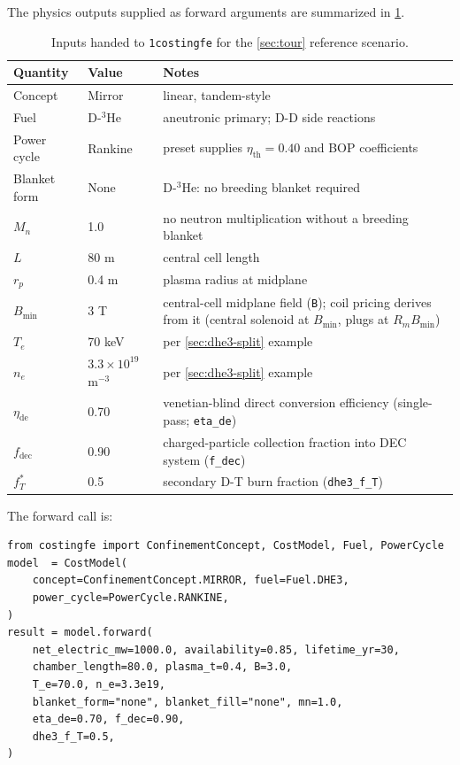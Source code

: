 \documentclass{article}
\begin{document}
The physics outputs supplied as forward arguments are summarized in
\cref{tab:tour-inputs}.

\begin{table}[htbp]
\caption{Inputs handed to \texttt{1costingfe} for the
\cref{sec:tour} reference scenario.}
\label{tab:tour-inputs}
\centering
\begin{tabular}{lll}
\toprule
Quantity & Value & Notes \\
\midrule
Concept       & Mirror              & linear, tandem-style \\
Fuel          & D-${}^3$He          & aneutronic primary; D-D side reactions \\
Power cycle   & Rankine             & preset supplies $\eta_{\text{th}} = 0.40$ and BOP coefficients \\
Blanket form  & None                & D-${}^3$He: no breeding blanket required \\
$M_n$         & 1.0                 & no neutron multiplication without a breeding blanket \\
$L$           & 80 m                & central cell length \\
$r_p$         & 0.4 m               & plasma radius at midplane \\
$B_{\min}$    & 3 T                 & central-cell midplane field (\texttt{B}); coil pricing derives from it (central solenoid at $B_{\min}$, plugs at $R_m B_{\min}$) \\
$T_e$         & 70 keV              & per \cref{sec:dhe3-split} example \\
$n_e$         & $3.3 \times 10^{19}$ m${}^{-3}$ & per \cref{sec:dhe3-split} example \\
$\eta_{\text{de}}$ & 0.70           & venetian-blind direct conversion efficiency (single-pass; \texttt{eta\_de}) \\
$f_{\text{dec}}$ & 0.90             & charged-particle collection fraction into DEC system (\texttt{f\_dec}) \\
$f_T^*$       & 0.5                 & secondary D-T burn fraction (\texttt{dhe3\_f\_T}) \\
\bottomrule
\end{tabular}
\end{table}

The forward call is:

\begin{minipage}{\linewidth}
\begin{lstlisting}
from costingfe import ConfinementConcept, CostModel, Fuel, PowerCycle
model  = CostModel(
    concept=ConfinementConcept.MIRROR, fuel=Fuel.DHE3,
    power_cycle=PowerCycle.RANKINE,
)
result = model.forward(
    net_electric_mw=1000.0, availability=0.85, lifetime_yr=30,
    chamber_length=80.0, plasma_t=0.4, B=3.0,
    T_e=70.0, n_e=3.3e19,
    blanket_form="none", blanket_fill="none", mn=1.0,
    eta_de=0.70, f_dec=0.90,
    dhe3_f_T=0.5,
)
\end{lstlisting}
\end{minipage}
\end{document}
